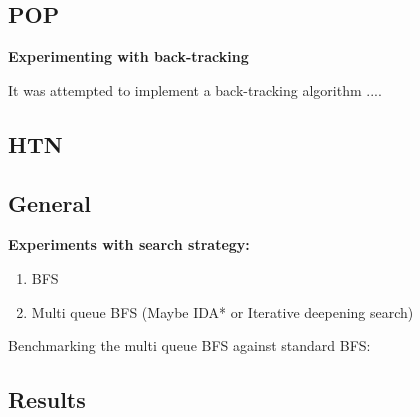 \documentclass[Main]{subfiles}
\begin{document}
\subsection{POP}

\textbf{Experimenting with back-tracking}

It was attempted to implement a back-tracking algorithm ....






\subsection{HTN}





\subsection{General} 


\textbf{Experiments with search strategy:}

\begin{enumerate}
    \item BFS 
    \item Multi queue BFS (Maybe IDA* or Iterative deepening search)
\end{enumerate}



Benchmarking the multi queue BFS against standard BFS:





\subsection{Results}
\end{document}
